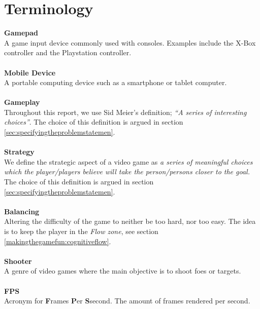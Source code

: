 \section*{Terminology}\label{preface:terminology}
\textbf{Gamepad}\vspace{4pt}\\
A game input device commonly used with consoles.
Examples include the X-Box controller and the Playstation controller.\\
\\
\textbf{Mobile Device}\vspace{4pt}\\
A portable computing device such as a smartphone or tablet computer.\cite{mobileOx}\\
\\
\textbf{Gameplay}\vspace{4pt}\\
Throughout this report, we use Sid Meier's definition; \textit{``A series of interesting choices''}\cite{GDC2012}.
The choice of this definition is argued in section \ref{sec:specifyingtheproblemstatemen}.\\
\\
\textbf{Strategy}\vspace{4pt}\\
We define the strategic aspect of a video game as \emph{a series of meaningful choices which the player/players believe will take the person/persons closer to the goal.}
The choice of this definition is argued in section \ref{sec:specifyingtheproblemstatemen}.\\
\\
\textbf{Balancing}\vspace{4pt}\\
Altering the difficulty of the game to neither be too hard, nor too easy.
The idea is to keep the player in the \textit{Flow zone}, see section \ref{makingthegamefun:cognitiveflow}.\\
\\
\textbf{Shooter}\vspace{4pt}\\
A genre of video games where the main objective is to shoot foes or targets. \cite{oxShooter}\\
\\
\textbf{FPS}\vspace{4pt}\\
Acronym for \textbf{F}rames \textbf{P}er \textbf{S}second.
The amount of frames rendered per second.\\
\\
